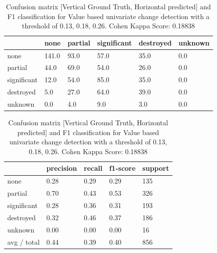 \begin{table} [H]
	\footnotesize
	\captionsetup{justification=raggedright,singlelinecheck=false}
	\caption{Confusion matrix [Vertical Ground Truth, Horizontal predicted] and F1 classification for Value based univariate change detection with a threshold of 0.13, 0.18, 0.26. Cohen Kappa Score: 0.18838}
	\begin{tabular}{l|lllll}
	& none  & partial & significant & destroyed & unknown \\\hline
	none        & 141.0 & 93.0    & 57.0        & 35.0      & 0.0     \\
	partial     & 44.0  & 69.0    & 54.0        & 26.0      & 0.0     \\
	significant & 12.0  & 54.0    & 85.0        & 35.0      & 0.0     \\
	destroyed   & 5.0   & 27.0    & 64.0        & 39.0      & 0.0     \\
	unknown     & 0.0   & 4.0     & 9.0         & 3.0       & 0.0  
	\end{tabular}
	\begin{tabular}{l|llll}
            & precision & recall & f1-score & support \\\hline
none        & 0.28      & 0.29   & 0.29     & 135     \\
partial     & 0.70      & 0.43   & 0.53     & 326     \\
significant & 0.28      & 0.36   & 0.31     & 193     \\
destroyed   & 0.32      & 0.46   & 0.37     & 186     \\
unknown     & 0.00      & 0.00   & 0.00     & 16      \\
avg / total & 0.44      & 0.39   & 0.40     & 856    
	\end{tabular}
	\label{tab:matV2}
\end{table}


